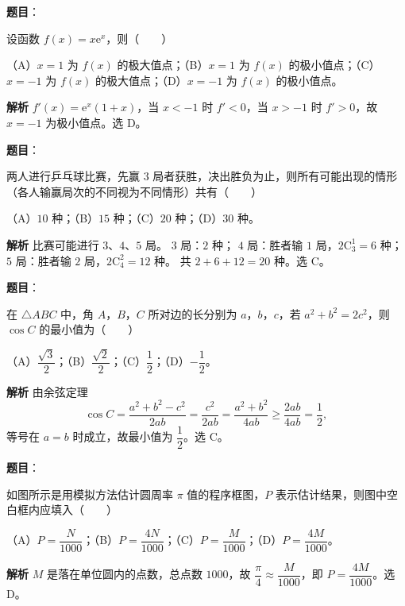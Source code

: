 \begin{answer}

\textbf{题目}：

设函数 $f(x)=x\mathrm e^x$，则\mbox{（　　）}

（A）$x=1$ 为 $f(x)$ 的极大值点；（B）$x=1$ 为 $f(x)$ 的极小值点；（C）$x=-1$ 为 $f(x)$ 的极大值点；（D）$x=-1$ 为 $f(x)$ 的极小值点。

\textbf{解析}
$f'(x)=\mathrm e^x(1+x)$，当 $x<-1$ 时 $f'<0$，当 $x>-1$ 时 $f'>0$，故 $x=-1$ 为极小值点。选 D。


\end{answer}
\begin{answer}

\textbf{题目}：

两人进行乒乓球比赛，先赢 $3$ 局者获胜，决出胜负为止，则所有可能出现的情形（各人输赢局次的不同视为不同情形）共有\mbox{（　　）}

（A）$10$ 种；（B）$15$ 种；（C）$20$ 种；（D）$30$ 种。

\textbf{解析}
比赛可能进行 $3$、$4$、$5$ 局。
$3$ 局：$2$ 种；
$4$ 局：胜者输 $1$ 局，$2\mathrm C_3^1=6$ 种；
$5$ 局：胜者输 $2$ 局，$2\mathrm C_4^2=12$ 种。
共 $2+6+12=20$ 种。选 C。


\end{answer}
\begin{answer}

\textbf{题目}：

在 $\triangle ABC$ 中，角 $A$，$B$，$C$ 所对边的长分别为 $a$，$b$，$c$，若 $a^2+b^2=2c^2$，则 $\cos C$ 的最小值为\mbox{（　　）}

（A）$\dfrac{\sqrt3}2$；（B）$\dfrac{\sqrt2}2$；（C）$\dfrac12$；（D）$-\dfrac12$。

\textbf{解析}
由余弦定理
\nopagebreak[4]
\[\cos C=\frac{a^2+b^2-c^2}{2ab}=\frac{c^2}{2ab}=\frac{a^2+b^2}{4ab}\geqslant\frac{2ab}{4ab}=\frac12,\]
等号在 $a=b$ 时成立，故最小值为 $\dfrac12$。选 C。


\end{answer}
\begin{answer}

\textbf{题目}：

如图所示是用模拟方法估计圆周率 $\pi$ 值的程序框图，$P$ 表示估计结果，则图中空白框内应填入\mbox{（　　）}
\nopagebreak[4]
\begin{center}\end{center}
\nopagebreak[4]
（A）$P=\dfrac N{1000}$；（B）$P=\dfrac{4N}{1000}$；（C）$P=\dfrac M{1000}$；（D）$P=\dfrac{4M}{1000}$。

\textbf{解析}
$M$ 是落在单位圆内的点数，总点数 $1000$，故 $\dfrac{\pi}4\approx\dfrac M{1000}$，即 $P=\dfrac{4M}{1000}$。选 D。


\end{answer}
